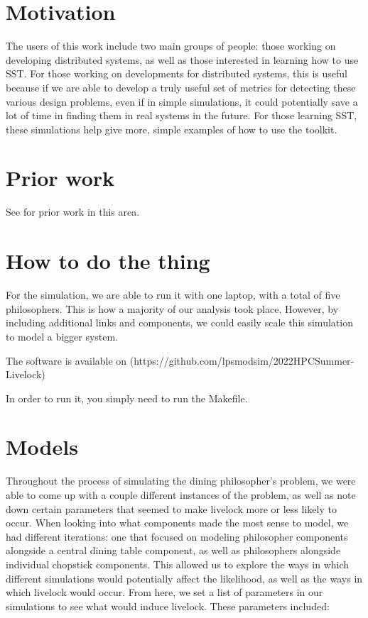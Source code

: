 \documentclass{article}
\begin{document}
\section{Motivation} %

The users of this work include two main groups of people: those working on developing distributed systems, as well 
as those interested in learning how to use SST.  For those working on developments for distributed systems, this is 
useful because if we are able to develop a truly useful set of metrics for detecting these various design problems, 
even if in simple simulations, it could potentially save a lot of time in finding them in real systems in the future.  
For those learning SST, these simulations help give more, simple examples of how to use the toolkit.

\section{Prior work} %

See \cite{texbook} for prior work in this area.

\section{How to do the thing}

For the simulation, we are able to run it with one laptop, with a total of five philosophers.  This is how a 
majority of our analysis took place.  However, by including additional links and components, we could easily 
scale this simulation to model a bigger system.

The software is available on (https://github.com/lpsmodsim/2022HPCSummer-Livelock)

In order to run it, you simply need to run the Makefile.

\section{Models} %
Throughout the process of simulating the dining philosopher's problem, we were able to come up with a couple different instances of the 
problem, as well as note down certain parameters that seemed to make livelock more or less likely to occur.  When looking into what components 
made the most sense to model, we had different iterations: one that focused on modeling philosopher components alongside a central dining table 
component, as well as philosophers alongside individual chopstick components.  This allowed us to explore the ways in which different simulations 
would potentially affect the likelihood, as well as the ways in which livelock would occur.  From here, we set a list of parameters in our 
simulations to see what would induce livelock.  These parameters included:
\end{document}
